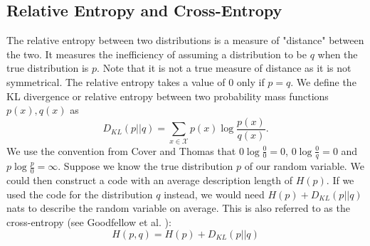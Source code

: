 \subsection{Relative Entropy and Cross-Entropy}
The relative entropy between two distributions is a measure of "distance" between the two. It measures the inefficiency of assuming a distribution to be $q$ when the true distribution is $p$. Note that it is not a true measure of distance as it is not symmetrical. The relative entropy takes a value of $0$ only if $p = q$.
We define the KL divergence or relative entropy between two probability mass functions $p(x), q(x)$ as
\begin{equation}
    D_{KL}(p||q) = \sum_{x \in \mathcal{X}} p(x)\log \frac{p(x)}{q(x)}.
\end{equation}
We use the convention from Cover and Thomas \cite{Cover2005} that $0 \log \frac{0}{0} = 0$, $0 \log \frac{0}{q} = 0$ and $p \log \frac{p}{0} = \infty$.
Suppose we know the true distribution $p$ of our random variable. We could then construct a code with an average description length of $H(p)$. If we used the code for the distribution $q$ instead, we would need $H(p) + D_{KL}(p||q)$ nats to describe the random variable on average. This is also referred to as the cross-entropy (see Goodfellow et al. \cite{Goodfellow-et-al-2016}):
\begin{equation}
    H(p,q) =  H(p) + D_{KL}(p||q)
\end{equation}



